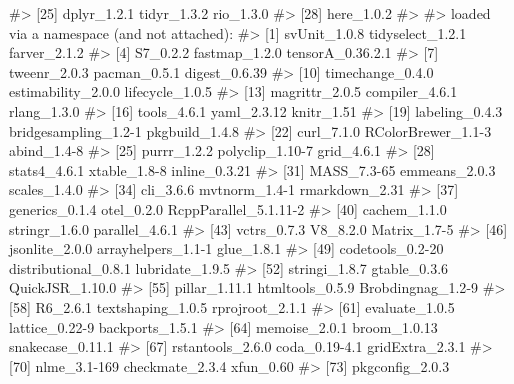 \documentclass[
  italian,
  letterpaper,
  a4paper,
  11pt,
  open=any]{scrbook}
\newenvironment{Shaded}{\begin{snugshade}}{\end{snugshade}}
\newcommand{\CommentTok}[1]{\textcolor[rgb]{0.37,0.37,0.37}{#1}}
\theoremstyle{plain}
\theoremstyle{definition}
\theoremstyle{definition}
\theoremstyle{remark}
\begin{document}
\begin{tcolorbox}
\begin{Shaded}
\begin{Highlighting}[]
\CommentTok{\#\textgreater{} [25] dplyr\_1.2.1           tidyr\_1.3.2           rio\_1.3.0            }
\CommentTok{\#\textgreater{} [28] here\_1.0.2           }
\CommentTok{\#\textgreater{} }
\CommentTok{\#\textgreater{} loaded via a namespace (and not attached):}
\CommentTok{\#\textgreater{}  [1] svUnit\_1.0.8          tidyselect\_1.2.1      farver\_2.1.2         }
\CommentTok{\#\textgreater{}  [4] S7\_0.2.2              fastmap\_1.2.0         tensorA\_0.36.2.1     }
\CommentTok{\#\textgreater{}  [7] tweenr\_2.0.3          pacman\_0.5.1          digest\_0.6.39        }
\CommentTok{\#\textgreater{} [10] timechange\_0.4.0      estimability\_2.0.0    lifecycle\_1.0.5      }
\CommentTok{\#\textgreater{} [13] magrittr\_2.0.5        compiler\_4.6.1        rlang\_1.3.0          }
\CommentTok{\#\textgreater{} [16] tools\_4.6.1           yaml\_2.3.12           knitr\_1.51           }
\CommentTok{\#\textgreater{} [19] labeling\_0.4.3        bridgesampling\_1.2{-}1  pkgbuild\_1.4.8       }
\CommentTok{\#\textgreater{} [22] curl\_7.1.0            RColorBrewer\_1.1{-}3    abind\_1.4{-}8          }
\CommentTok{\#\textgreater{} [25] purrr\_1.2.2           polyclip\_1.10{-}7       grid\_4.6.1           }
\CommentTok{\#\textgreater{} [28] stats4\_4.6.1          xtable\_1.8{-}8          inline\_0.3.21        }
\CommentTok{\#\textgreater{} [31] MASS\_7.3{-}65           emmeans\_2.0.3         scales\_1.4.0         }
\CommentTok{\#\textgreater{} [34] cli\_3.6.6             mvtnorm\_1.4{-}1         rmarkdown\_2.31       }
\CommentTok{\#\textgreater{} [37] generics\_0.1.4        otel\_0.2.0            RcppParallel\_5.1.11{-}2}
\CommentTok{\#\textgreater{} [40] cachem\_1.1.0          stringr\_1.6.0         parallel\_4.6.1       }
\CommentTok{\#\textgreater{} [43] vctrs\_0.7.3           V8\_8.2.0              Matrix\_1.7{-}5         }
\CommentTok{\#\textgreater{} [46] jsonlite\_2.0.0        arrayhelpers\_1.1{-}1    glue\_1.8.1           }
\CommentTok{\#\textgreater{} [49] codetools\_0.2{-}20      distributional\_0.8.1  lubridate\_1.9.5      }
\CommentTok{\#\textgreater{} [52] stringi\_1.8.7         gtable\_0.3.6          QuickJSR\_1.10.0      }
\CommentTok{\#\textgreater{} [55] pillar\_1.11.1         htmltools\_0.5.9       Brobdingnag\_1.2{-}9    }
\CommentTok{\#\textgreater{} [58] R6\_2.6.1              textshaping\_1.0.5     rprojroot\_2.1.1      }
\CommentTok{\#\textgreater{} [61] evaluate\_1.0.5        lattice\_0.22{-}9        backports\_1.5.1      }
\CommentTok{\#\textgreater{} [64] memoise\_2.0.1         broom\_1.0.13          snakecase\_0.11.1     }
\CommentTok{\#\textgreater{} [67] rstantools\_2.6.0      coda\_0.19{-}4.1         gridExtra\_2.3.1      }
\CommentTok{\#\textgreater{} [70] nlme\_3.1{-}169          checkmate\_2.3.4       xfun\_0.60            }
\CommentTok{\#\textgreater{} [73] pkgconfig\_2.0.3}
\end{Highlighting}
\end{Shaded}

\end{tcolorbox}
\end{document}
